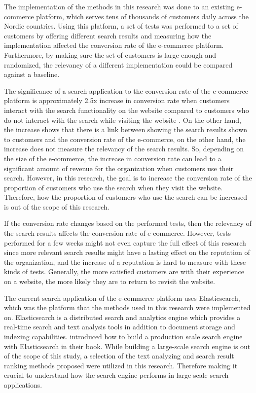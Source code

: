 The implementation of the methods in this research was done to an existing e-commerce platform, 
which serves tens of thousands of customers daily across the Nordic countries. 
Using this platform, a set of tests was performed to a set of customers by offering different search results 
and measuring how the implementation affected the conversion rate of the e-commerce platform.
Furthermore, by making sure the set of customers is large enough and randomized, 
the relevancy of a different implementation could be compared against a baseline.


The significance of a search application to the conversion rate of the e-commerce platform is 
approximately 2.5x increase in conversion rate
when customers interact with the search functionality on the website compared to
customers who do not interact with the search while visiting the website \cite{powerAnalytics}.
On the other hand, the increase shows that there is a link between showing the search results 
shown to customers and the conversion rate of the e-commerce, 
on the other hand, the increase does not measure the relevancy of the search results.
So, depending on the size of the e-commerce, the increase in conversion rate can lead to 
a significant amount of revenue for the organization when customers use their search.
However, in this research, the goal is to increase the conversion rate of the proportion of customers 
who use the search when they visit the website. 
Therefore, how the proportion of customers who use the search can be increased is out of the scope of this research.


If the conversion rate changes based on the performed tests,
then the relevancy of the search results affects the conversion rate of e-commerce.
However, tests performed for a few weeks might not even capture the full effect of this research 
since more relevant search results might have a lasting effect on the reputation of the organization, 
and the increase of a reputation is hard to measure with these kinds of tests. 
Generally, the more satisfied customers are with their experience on a website, 
the more likely they are to return to revisit the website.


The current search application of the e-commerce platform uses Elasticsearch, which was
the platform that the methods used in this research were implemented on.
Elasticsearch is a distributed search and analytics engine which provides 
a real-time search and text analysis tools in addition to document storage and indexing capabilities. 
\citeauthor{relevantSearch} \cite{relevantSearch} introduced how to build 
a production scale search engine with Elasticsearch in their book. 
While building a large-scale search engine is out of the scope of this study, 
a selection of the text analyzing and search result ranking methods \citeauthor{relevantSearch} \cite{relevantSearch} 
proposed were utilized in this research.
Therefore making it crucial to understand how the search engine performs in large scale search applications.





